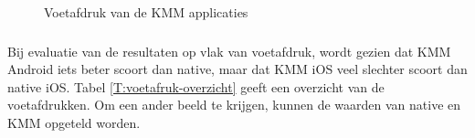 \begin{figure}
    \qquad
    \caption{Voetafdruk van de KMM applicaties}
    \label{fig:M-voetafdruk-kmm}
\end{figure}

\subsubsection{}
\label{sec:M-test-voetafdruk-conclusie}
Bij evaluatie van de resultaten op vlak van voetafdruk, wordt gezien dat KMM Android iets beter scoort dan native, maar dat KMM iOS veel slechter scoort dan native iOS. Tabel \ref{T:voetafruk-overzicht} geeft een overzicht van de voetafdrukken. Om een ander beeld te krijgen, kunnen de waarden van native en KMM opgeteld worden.


